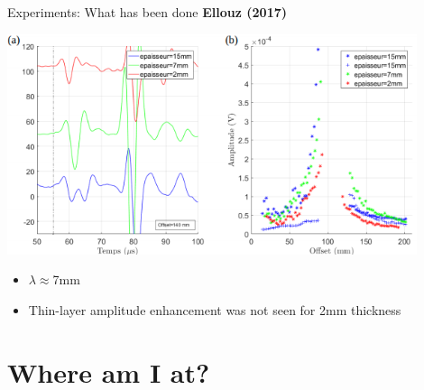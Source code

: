 \documentclass[utf8]{beamer} \usetheme{lfcr} %
\begin{document}
%
\begin{frame}{Experiments: What has been done}
  {\textbf{Ellouz (2017)}}

  \begin{center}
    \vspace*{2.5cm}
    \includegraphics[width=0.9\textwidth]{ellouz2017_2}%
  \end{center}

  \begin{itemize}
    \item $\lambda \approx $7mm
    \item Thin-layer amplitude enhancement was not seen for 2mm thickness
     
  \end{itemize}

\end{frame}
%
\section{Where am I at?}
\end{document}
